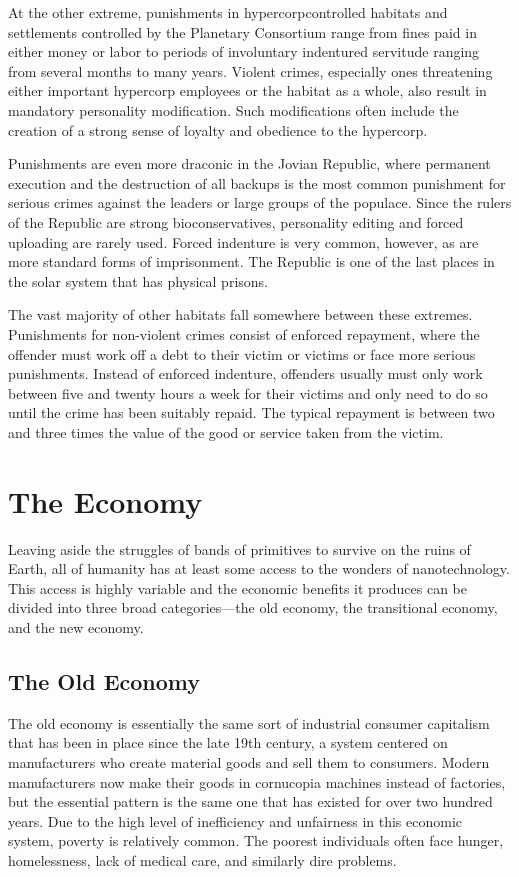 At the other extreme, punishments in hypercorpcontrolled habitats and settlements controlled by the 
Planetary Consortium range from fines paid in either 
money or labor to periods of involuntary indentured 
servitude ranging from several months to many years. 
Violent crimes, especially ones threatening either 
important hypercorp employees or the habitat as a 
whole, also result in mandatory personality modification. Such modifications often include the creation of a 
strong sense of loyalty and obedience to the hypercorp.

Punishments are even more draconic in the Jovian 
Republic, where permanent execution and the destruction of all backups is the most common punishment for serious crimes against the leaders or large 
groups of the populace. Since the rulers of the Republic are strong bioconservatives, personality editing and 
forced uploading are rarely used. Forced indenture is 
very common, however, as are more standard forms of 
imprisonment. The Republic is one of the last places 
in the solar system that has physical prisons.

The vast majority of other habitats fall somewhere 
between these extremes. Punishments for non-violent 
crimes consist of enforced repayment, where the offender must work off a debt to their victim or victims 
or face more serious punishments. Instead of enforced 
indenture, offenders usually must only work between 
five and twenty hours a week for their victims and 
only need to do so until the crime has been suitably 
repaid. The typical repayment is between two and 
three times the value of the good or service taken 
from the victim.

\section{The Economy}

Leaving aside the struggles of bands of primitives to 
survive on the ruins of Earth, all of humanity has at 
least some access to the wonders of nanotechnology. 
This access is highly variable and the economic benefits it produces can be divided into three broad categories—the old economy, the transitional economy, 
and the new economy.

\subsection{The Old Economy}

The old economy is essentially the same sort of industrial consumer capitalism that has been in place since 
the late 19th century, a system centered on manufacturers who create material goods and sell them to 
consumers. Modern manufacturers now make their 
goods in cornucopia machines instead of factories, but 
the essential pattern is the same one that has existed 
for over two hundred years. Due to the high level of 
inefficiency and unfairness in this economic system, 
poverty is relatively common. The poorest individuals 
often face hunger, homelessness, lack of medical care, 
and similarly dire problems.


